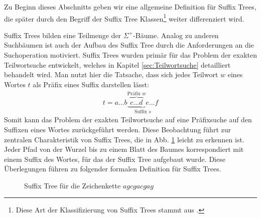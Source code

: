\documentclass[12pt]{report}
\begin{document}
Zu Beginn dieses Abschnitts geben wir eine allgemeine Definition für Suffix Trees, die später durch den Begriff der Suffix Tree Klassen\footnote{Diese Art der Klassifizierung von Suffix Trees stammt aus \cite{Giegerich1995}.} weiter differenziert wird.

Suffix Trees bilden eine Teilmenge der $\Sigma^+$-Bäume. Analog zu anderen Suchbäumen ist auch der Aufbau des Suffix Tree durch die Anforderungen an die Suchoperation motiviert. Suffix Trees wurden primär für das Problem der exakten Teilwortsuche entwickelt, welches in Kapitel \ref{sec:Teilwortsuche} detailliert behandelt wird. Man nutzt hier die Tatsache, dass sich jedes Teilwort $w$ eines Wortes $t$ als Präfix eines Suffix darstellen lässt:
\begin{gather*}
    t = a \dots b \underbrace{\overbrace{c \dots d}^{\text{Präfix }w} e \dots f}_{\text{Suffix }s}
\end{gather*}
Somit kann das Problem der exakten Teilwortsuche auf eine Präfixsuche auf den Suffixen eines Wortes zurückgeführt werden. Diese Beobachtung führt zur zentralen Charakteristik von Suffix Trees, die in Abb. \ref{fig:suffixTreeAgcgacgag} leicht zu erkennen ist. Jeder Pfad von der Wurzel bis zu einem Blatt des Baumes korrespondiert mit einem Suffix des Wortes, für das der Suffix Tree aufgebaut wurde. Diese Überlegungen führen zu folgender formalen Definition für Suffix Trees.

\begin{figure}[htb]
\centering
{}
\caption{Suffix Tree für die Zeichenkette $agcgacgag$}
\label{fig:suffixTreeAgcgacgag}
\end{figure}
\end{document}
